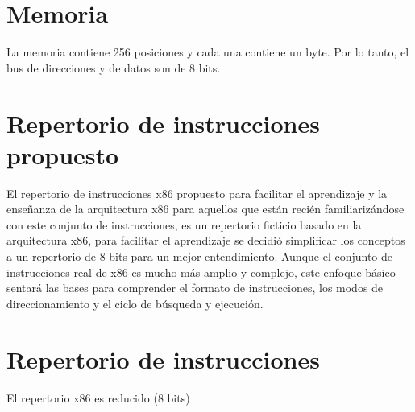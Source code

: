 \documentclass[12pt,twoside]{templates/unerthesis}
\begin{document}
\hypertarget{memoria}{%
\section{Memoria}\label{memoria}}

La memoria contiene 256 posiciones y cada una contiene un byte. Por lo tanto, el bus de direcciones y de datos son de 8 bits.

\hypertarget{repertorio-de-instrucciones-propuesto}{%
\section{Repertorio de instrucciones propuesto}\label{repertorio-de-instrucciones-propuesto}}

El repertorio de instrucciones x86 propuesto para facilitar el aprendizaje y la enseñanza de la arquitectura x86 para aquellos que están recién familiarizándose con este conjunto de instrucciones, es un repertorio ficticio basado en la arquitectura x86, para facilitar el aprendizaje se decidió simplificar los conceptos a un repertorio de 8 bits para un mejor entendimiento. Aunque el conjunto de instrucciones real de x86 es mucho más amplio y complejo, este enfoque básico sentará las bases para comprender el formato de instrucciones, los modos de direccionamiento y el ciclo de búsqueda y ejecución.

\hypertarget{repertorio-de-instrucciones}{%
\section{Repertorio de instrucciones}\label{repertorio-de-instrucciones}}

El repertorio x86 es reducido (8 bits)
\end{document}
